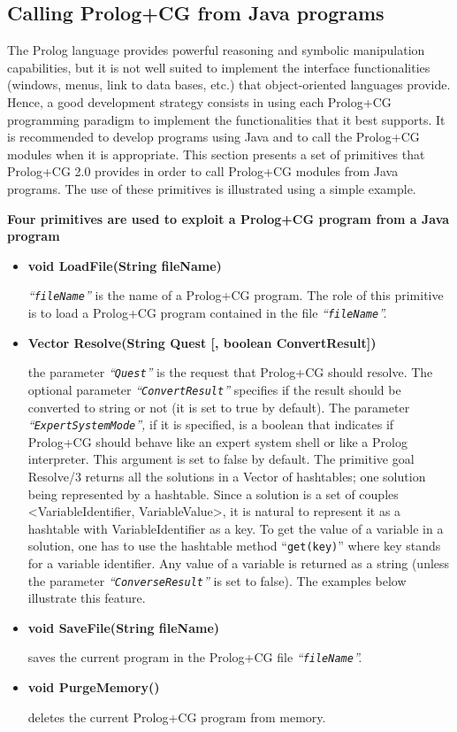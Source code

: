 \documentclass{book}
\begin{document}
\subsection{Calling Prolog+CG from Java programs}

The Prolog language provides powerful reasoning
and symbolic manipulation capabilities, but it is not well suited
to implement the interface functionalities (windows, menus, link to
data bases, etc.) that object-oriented languages provide. Hence, a
good development strategy consists in using each Prolog+CG
programming paradigm to implement the functionalities that it best
supports. It is recommended to develop programs using Java and to
call the Prolog+CG modules when it is appropriate. This section
presents a set of primitives that Prolog+CG 2.0 provides in order
to call Prolog+CG modules from Java programs. The use of these
primitives is illustrated using a simple example.

{\bf Four primitives are used to exploit a Prolog+CG program
from a Java program}

\begin{itemize}

\item {\bf void LoadFile(String fileName)}

{\it ``\texttt{fileName}''} is the name of a Prolog+CG program. The role of
this primitive is to load a Prolog+CG program contained in the file
{\it ``\texttt{fileName}''.}

\item {\bf Vector Resolve(String Quest [, boolean ConvertResult])}

the parameter {\it ``\texttt{Quest}''} is the request that Prolog+CG
should resolve. The optional parameter {\it
``\texttt{ConvertResult}''} specifies if the result should be
converted to string or not (it is set to true by default).  The
parameter {\it ``\texttt{ExpertSystemMode}'',} if it is specified, is
a boolean that indicates if Prolog+CG should behave like an expert
system shell or like a Prolog interpreter. This argument is set to
false by default. The primitive goal Resolve/3 returns all the
solutions in a Vector of hashtables; one solution being represented by
a hashtable. Since a solution is a set of couples <VariableIdentifier,
VariableValue>, it is natural to represent it as a hashtable with
VariableIdentifier as a key. To get the value of a variable in a
solution, one has to use the hashtable method ``\texttt{get(key)}''
where key stands for a variable identifier. Any value of a variable is
returned as a string (unless the parameter {\it
``\texttt{ConverseResult}''} is set to false). The examples below
illustrate this feature.

\item {\bf void SaveFile(String fileName)}

saves the current program in the Prolog+CG file
{\it ``\texttt{fileName}''.}

\item {\bf void PurgeMemory()}

deletes the current Prolog+CG program from memory.

\end{itemize}
\end{document}
